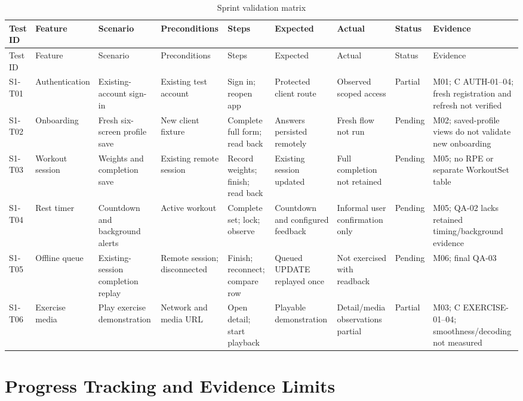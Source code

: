 \documentclass[12pt,a4paper,openany]{report}
\begin{document}
\begingroup
\scriptsize
\setlength{\tabcolsep}{2pt}
\renewcommand{\arraystretch}{1.20}
\setlength{\LTpre}{5pt}
\setlength{\LTpost}{10pt}
\begin{longtable}{|L{1.20cm}|L{1.50cm}|L{1.60cm}|L{1.60cm}|L{1.80cm}|L{1.80cm}|L{1.65cm}|L{1.35cm}|L{2.00cm}|}
\caption{Sprint validation matrix}\label{tab:pdf-42-21} \\
\hline
{}
Test ID & Feature & Scenario & Preconditions & Steps & Expected & Actual & Status & Evidence \\ \hline
\endfirsthead
\hline
{}
Test ID & Feature & Scenario & Preconditions & Steps & Expected & Actual & Status & Evidence \\ \hline
\endhead
S1-T01 & Authentication & Existing-account sign-in & Existing test account & Sign in; reopen app & Protected client route & Observed scoped access & Partial & M01; C AUTH-01--04; fresh registration and refresh not verified \\ \hline
S1-T02 & Onboarding & Fresh six-screen profile save & New client fixture & Complete full form; read back & Answers persisted remotely & Fresh flow not run & Pending & M02; saved-profile views do not validate new onboarding \\ \hline
S1-T03 & Workout session & Weights and completion save & Existing remote session & Record weights; finish; read back & Existing session updated & Full completion not retained & Pending & M05; no RPE or separate WorkoutSet table \\ \hline
S1-T04 & Rest timer & Countdown and background alerts & Active workout & Complete set; lock; observe & Countdown and configured feedback & Informal user confirmation only & Pending & M05; QA-02 lacks retained timing\slash{}background evidence \\ \hline
S1-T05 & Offline queue & Existing-session completion replay & Remote session; disconnected & Finish; reconnect; compare row & Queued UPDATE replayed once & Not exercised with readback & Pending & M06; final QA-03 \\ \hline
S1-T06 & Exercise media & Play exercise demonstration & Network and media URL & Open detail; start playback & Playable demonstration & Detail\slash{}media observations partial & Partial & M03; C EXERCISE-01--04; smoothness\slash{}decoding not measured \\ \hline
\end{longtable}
\endgroup

\section{Progress Tracking and Evidence Limits}
\end{document}
